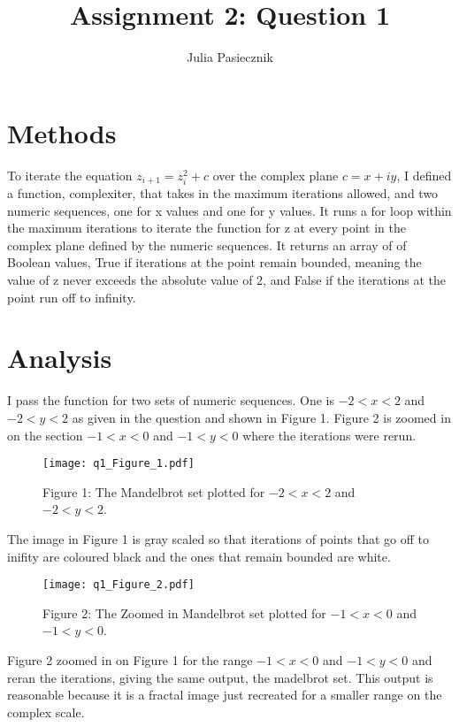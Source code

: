 \documentclass[apj]{emulateapj}
\begin{document}
\title{Assignment 2: Question 1}
 
\author{Julia Pasiecznik}

\section{Methods}
\label{sec:Methods}
To iterate the equation $z_{i + 1} = z_i^2 + c$ over the complex plane $c = x + iy$, I defined a function, complexiter, 
that takes in the maximum iterations allowed, and two numeric sequences, one for x values and one for y values. It runs
a for loop within the maximum iterations to iterate the function for z at every point in the complex plane defined by the
numeric sequences. It returns an array of of Boolean values, True if iterations at the point remain bounded, meaning the 
value of z never exceeds the absolute value of 2, and False if the iterations at the point run off to infinity.

\section{Analysis}
\label{sec:Analysis}
I pass the function for two sets of numeric sequences. One is $-2 < x < 2$ and $-2 < y < 2$ as given in the question and shown in Figure 1. Figure 2 is zoomed in on the section $-1 < x < 0$ and $-1 < y < 0$ where the iterations were rerun.

\begin{figure}
\texttt{[image: q1\_Figure\_1.pdf]}
\caption{Figure 1: The Mandelbrot set plotted for $-2 < x < 2$ and $-2 < y < 2$.}
\label{fig:Mandelbrot Set}
\end{figure}

The image in Figure 1 is gray scaled so that iterations of points that go off to inifity are coloured black and the ones that remain bounded are white.

\begin{figure}
\texttt{[image: q1\_Figure\_2.pdf]}
\caption{Figure 2: The Zoomed in Mandelbrot set plotted for $-1 < x < 0$ and $-1 < y < 0$.}
\label{fig: Zoomed in Mandelbrot Set}
\end{figure}

Figure 2 zoomed in on Figure 1 for the range $-1 < x < 0$ and $-1 < y < 0$ and reran the iterations, giving the same output, the madelbrot set. This output is reasonable because it is a fractal image just recreated for a smaller range on the complex scale.
\end{document}
